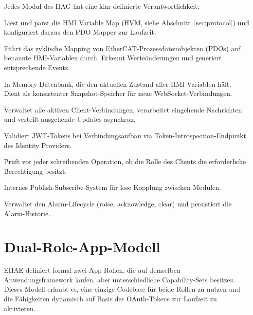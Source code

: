 ﻿\documentclass[12pt,a4paper]{article}
\begin{document}
Jedes Modul des HAG hat eine klar definierte Verantwortlichkeit:

\begin{description}[leftmargin=2em]
  \item[Config Loader] Liest und parst die HMI Variable Map (HVM, siehe
    Abschnitt~\ref{sec:protocol}) und konfiguriert daraus den PDO Mapper zur Laufzeit.
  \item[PDO Mapper] Führt das zyklische Mapping von EtherCAT-Prozessdatenobjekten
    (PDOs) auf benannte HMI-Variablen durch. Erkennt Werteänderungen und generiert
    entsprechende Events.
  \item[Variable Database] In-Memory-Datenbank, die den aktuellen Zustand aller
    HMI-Varia\-blen hält. Dient als konsistenter Snapshot-Speicher für neue
    WebSocket-Verbindungen.
  \item[WebSocket Server] Verwaltet alle aktiven Client-Verbindungen, verarbeitet
    eingehende Nachrichten und verteilt ausgehende Updates asynchron.
  \item[Auth Broker] Validiert JWT-Tokens bei Verbindungsaufbau via
    Token-Introspection-Endpunkt des Identity Providers.
  \item[RBAC Engine] Prüft vor jeder schreibenden Operation, ob die Rolle des Clients die
    erforderliche Berechtigung besitzt.
  \item[Event Bus] Internes Publish-Subscribe-System für lose Kopplung zwischen Modulen.
  \item[Alarm Manager] Verwaltet den Alarm-Lifecycle (raise, acknowledge, clear) und
    persistiert die Alarm-Historie.
\end{description}

\section{Dual-Role-App-Modell}
\label{sec:dualrole}

EHAE definiert formal zwei App-Rollen, die auf demselben Anwendungsframework laufen,
aber unterschiedliche Capability-Sets besitzen. Dieses Modell erlaubt es, eine einzige
Codebase für beide Rollen zu nutzen und die Fähigkeiten dynamisch auf Basis des
OAuth-Tokens zur Laufzeit zu aktivieren.
\end{document}

